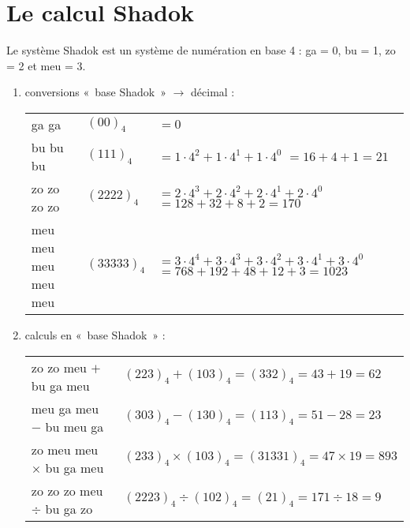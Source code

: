 \documentclass[11pt,a4paper]{article}
\begin{document}
\section{Le calcul Shadok}
Le système Shadok est un système de numération en base 4 :
{\sc ga} = 0, {\sc bu} = 1, {\sc zo} = 2 et {\sc meu} = 3.
\begin{enumerate}
\item conversions «~base Shadok~» $\rightarrow$ décimal :

	\begin{minipage}[t]{14cm}	
	\begin{tabular}{l@{ = }lp{6cm}}
	{\sc ga} {\sc ga} & $(00)_4$ & $= 0$\\[2mm]
	{\sc bu} {\sc bu} {\sc bu} & $(111)_4$ & $= 1\cdot 4^2 + 1\cdot 4^1 + 1\cdot 4^0$\newline
                                     $= 16 + 4 + 1$\newline $= 21$\\[2mm]
	{\sc zo} {\sc zo} {\sc zo} {\sc zo} & $(2222)_4$ & $= 2\cdot 4^3 + 2\cdot 4^2 + 2\cdot 4^1 + 2\cdot 4^0$\newline 
                                              $= 128 + 32 + 8 + 2$\newline $= 170$\\[2mm]
	{\sc meu} {\sc meu} {\sc meu} {\sc meu} {\sc meu} & $(33333)_4$ & $= 3 \cdot 4^4 + 3\cdot 4^3 + 3\cdot 4^2 + 3\cdot 4^1 + 3\cdot 4^0$\newline $= 768 + 192 + 48 + 12 + 3$\newline $= 1023$
	\end{tabular}
	\end{minipage}
\item calculs en «~base Shadok~» :

	\begin{minipage}[t]{14cm}
	\begin{tabular}{l@{ = }l}
	{\sc zo} {\sc zo} {\sc meu} $+$ {\sc bu} {\sc ga} {\sc meu} & $(223)_4 + (103)_4 = (332)_4 = 43 + 19 = 62$\\[2mm]
	{\sc meu} {\sc ga} {\sc meu} $-$ {\sc bu} {\sc meu} {\sc ga} & $(303)_4 - (130)_4 = (113)_4 = 51 - 28 = 23$\\[2mm]
	{\sc zo} {\sc meu} {\sc meu} $\times$ {\sc bu} {\sc ga} {\sc meu} & $(233)_4 \times (103)_4 = (31331)_4 = 47 \times 19 = 893$\\[2mm]
	{\sc zo} {\sc zo} {\sc zo} {\sc meu} $\div$ {\sc bu} {\sc ga} {\sc zo} & $(2223)_4 \div (102)_4 = (21)_4 = 171 \div 18 = 9$
	\end{tabular}
	\end{minipage}
\end{enumerate}


\label{fini}
\end{document}
